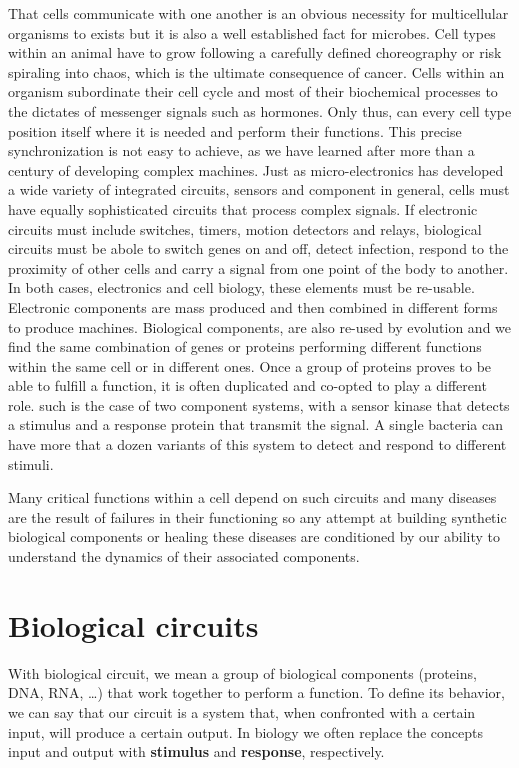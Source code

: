 That cells communicate with one another is an obvious necessity for multicellular organisms to exists but it is also a well established fact for microbes. Cell types within an animal have to grow following a carefully defined choreography or risk spiraling into chaos, which is the ultimate consequence of cancer. Cells within an organism subordinate their cell cycle and most of their biochemical  processes to the dictates of messenger signals such as hormones. Only thus, can every cell type position itself where it is needed and perform their functions. This precise synchronization is not easy to achieve, as we have learned after more than a century of developing complex machines. Just as micro-electronics has developed a wide variety of integrated circuits, sensors and component in general, cells must have equally sophisticated circuits that process complex signals. If electronic circuits must include switches, timers, motion detectors and relays, biological circuits must be abole to switch genes on and off, detect infection, respond to the proximity of other cells and carry a signal from one point of the body to another. In both cases, electronics and cell biology, these elements must be re-usable. Electronic components are mass produced and then combined in different forms to produce machines. Biological components, are also re-used by evolution and we find the same combination of genes or proteins performing different functions within the same cell or in different ones. Once a group of proteins proves to be able to fulfill a function, it is often duplicated and co-opted to play a different role. such is the case of two component systems, with a sensor kinase that detects a stimulus and a response protein that transmit the signal. A single bacteria can have more that a dozen variants of this system to detect and respond to different stimuli.

Many critical functions within a cell depend on such circuits and many diseases are the result of failures in their functioning so any attempt at building synthetic biological components or healing these diseases are conditioned by our ability to understand the dynamics of their associated components.

\section{Biological circuits}

With biological circuit, we mean a group of biological components (proteins, DNA, RNA, \dots ) that work together to perform a function. To define its behavior, we can say that our circuit is a system that, when confronted with a certain input, will produce a certain output. In biology we often replace the concepts input and output with \textbf{stimulus} and \textbf{response}, respectively.

